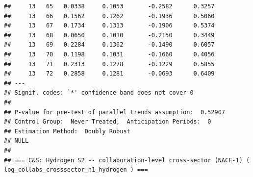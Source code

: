 \documentclass[
]{article}
\begin{document}
\begin{verbatim}
##     13   65   0.0338     0.1053       -0.2582      0.3257  
##     13   66   0.1562     0.1262       -0.1936      0.5060  
##     13   67   0.1734     0.1313       -0.1906      0.5374  
##     13   68   0.0650     0.1010       -0.2150      0.3449  
##     13   69   0.2284     0.1362       -0.1490      0.6057  
##     13   70   0.1198     0.1031       -0.1660      0.4056  
##     13   71   0.2313     0.1278       -0.1229      0.5855  
##     13   72   0.2858     0.1281       -0.0693      0.6409  
## ---
## Signif. codes: `*' confidence band does not cover 0
## 
## P-value for pre-test of parallel trends assumption:  0.52907
## Control Group:  Never Treated,  Anticipation Periods:  0
## Estimation Method:  Doubly Robust
## NULL
## 
## === C&S: Hydrogen S2 -- collaboration-level cross-sector (NACE-1) ( log_collabs_crosssector_n1_hydrogen ) ===
\end{verbatim}
\end{document}
